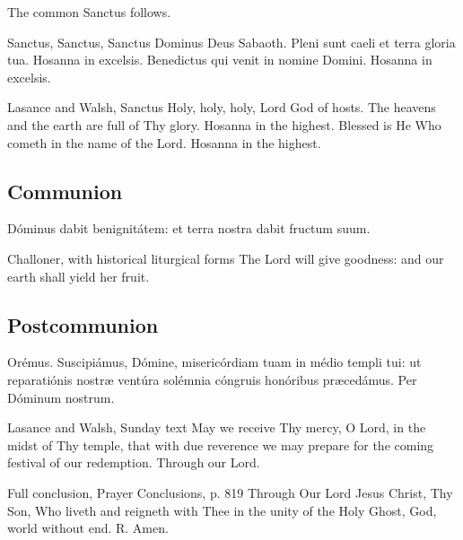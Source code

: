 The common Sanctus follows.

\begin{latinproper}
Sanctus, Sanctus, Sanctus Dominus Deus Sabaoth. Pleni sunt caeli et terra
gloria tua. Hosanna in excelsis. Benedictus qui venit in nomine Domini.
Hosanna in excelsis.
\end{latinproper}

\begin{englishwitness}{Lasance and Walsh, Sanctus}
Holy, holy, holy, Lord God of hosts. The heavens and the earth are full
of Thy glory. Hosanna in the highest. Blessed is He Who cometh in the
name of the Lord. Hosanna in the highest.
\end{englishwitness}

\subsection{Communion}
\label{proper-communion}

\begin{latinproper}
Dóminus dabit benignitátem: et terra nostra dabit fructum suum.
\end{latinproper}

\begin{englishwitness}{Challoner, with historical liturgical forms}
The Lord will give goodness: and our earth shall yield her fruit.
\end{englishwitness}

\subsection{Postcommunion}
\label{proper-postcommunion}

\begin{latinproper}
Orémus. Suscipiámus, Dómine, misericórdiam tuam in médio templi tui: ut reparatiónis nostræ ventúra solémnia cóngruis honóribus præcedámus. Per Dóminum nostrum.
\end{latinproper}

\begin{englishwitness}{Lasance and Walsh, Sunday text}
May we receive Thy mercy, O Lord, in the midst of Thy temple, that with due reverence we may prepare for the coming festival of our redemption. Through our Lord.
\end{englishwitness}

\begin{englishwitness}{Full conclusion, Prayer Conclusions, p. 819}
Through Our Lord Jesus Christ, Thy Son, Who liveth and reigneth with Thee in the unity of the Holy Ghost, God, world without end. R. Amen.
\end{englishwitness}
